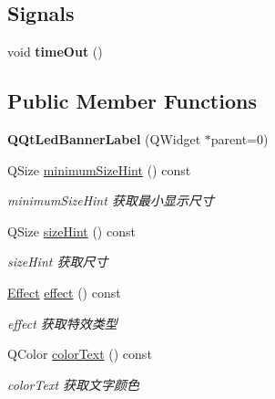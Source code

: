 \subsection*{Signals}
\begin{DoxyCompactItemize}
\item 
\mbox{\label{class_q_qt_led_banner_label_a6740a2b0cf1130d49c8e47d5e0595537}} 
void {\bfseries time\+Out} ()
\end{DoxyCompactItemize}
\subsection*{Public Member Functions}
\begin{DoxyCompactItemize}
\item 
\mbox{\label{class_q_qt_led_banner_label_a739c0abd9318c9f9ac0a53538c136f21}} 
{\bfseries Q\+Qt\+Led\+Banner\+Label} (Q\+Widget $\ast$parent=0)
\item 
Q\+Size \mbox{\hyperlink{class_q_qt_led_banner_label_a80074e5a422888b84715bd77c05bbf74}{minimum\+Size\+Hint}} () const
\begin{DoxyCompactList}\small\item\em minimum\+Size\+Hint 获取最小显示尺寸 \end{DoxyCompactList}\item 
Q\+Size \mbox{\hyperlink{class_q_qt_led_banner_label_a44bf9e2fb2eab10091f0789ccedb6ee7}{size\+Hint}} () const
\begin{DoxyCompactList}\small\item\em size\+Hint 获取尺寸 \end{DoxyCompactList}\item 
\mbox{\hyperlink{class_q_qt_led_banner_label_a8ea55a34d54e6fe09a74c5fd2d83e5dc}{Effect}} \mbox{\hyperlink{class_q_qt_led_banner_label_ad7fef5c655cd86259eaed058f8ba49df}{effect}} () const
\begin{DoxyCompactList}\small\item\em effect 获取特效类型 \end{DoxyCompactList}\item 
Q\+Color \mbox{\hyperlink{class_q_qt_led_banner_label_addadadbfba0ac9afb1b78df2a5ca4cc7}{color\+Text}} () const
\begin{DoxyCompactList}\small\item\em color\+Text 获取文字颜色 \end{DoxyCompactList}\item 

\end{DoxyCompactItemize}
